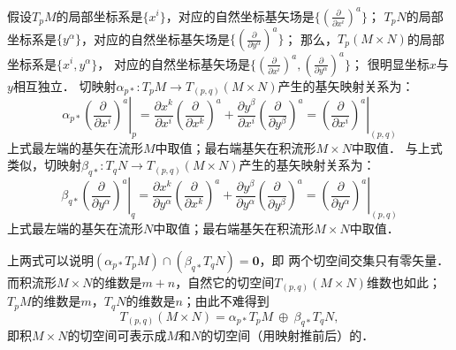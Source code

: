 假设$T_p M$的局部坐标系是$\{x^i\}$，对应的自然坐标基矢场是$\{(\frac{\partial }{\partial x^i})^a\}$；
$T_p N$的局部坐标系是$\{y^\alpha\}$，对应的自然坐标基矢场是$\{(\frac{\partial }{\partial y^\alpha})^a\}$；
那么，$T_p (M\times N)$的局部坐标系是$\{x^i,y^\alpha\}$，
对应的自然坐标基矢场是$\{(\frac{\partial }{\partial x^i})^a,(\frac{\partial }{\partial y^\alpha})^a\}$；
很明显坐标$x$与$y$相互独立．
切映射$\alpha_{p*} : T_p M \to T_{(p,q)}(M\times N)$产生的基矢映射关系为：
\begin{equation}
    \alpha_{p*} \left. \left(\frac{\partial }{\partial x^i}\right)^a \right|_{p}=
    \frac{\partial x^k}{\partial x^i}\left(\frac{\partial }{\partial x^k}\right)^a
    +\frac{\partial y^\beta}{\partial x^i}\left(\frac{\partial }{\partial y^\beta}\right)^a
    =\left. \left(\frac{\partial }{\partial x^i}\right)^a \right|_{{(p,q)}}
\end{equation}
上式最左端的基矢在流形$M$中取值；最右端基矢在积流形$M\times N$中取值．
与上式类似，切映射$\beta_{q*} : T_q N \to T_{(p,q)}(M\times N)$产生的基矢映射关系为：
\begin{equation}
    \beta_{q*} \left. \left(\frac{\partial }{\partial y^\alpha}\right)^a \right|_{q}=
    \frac{\partial x^k}{\partial y^\alpha}\left(\frac{\partial }{\partial x^k}\right)^a
    +\frac{\partial y^\beta}{\partial y^\alpha}\left(\frac{\partial }{\partial y^\beta}\right)^a
    =\left. \left(\frac{\partial }{\partial y^\alpha}\right)^a \right|_{{(p,q)}}
\end{equation}
上式最左端的基矢在流形$N$中取值；最右端基矢在积流形$M\times N$中取值．

上两式可以说明$(\alpha_{p*} T_p M) \cap (\beta_{q*}  T_q N) =\boldsymbol{0}$，即
两个切空间交集只有零矢量．而积流形$M\times N$的维数是$m+n$，自然它的切空间$T_{(p,q)} (M\times N)$维数也如此；
$T_p M$的维数是$m$，$T_q N$的维数是$n$；由此不难得到
\begin{equation}
    T_{(p,q)} (M\times N) = \alpha_{p*} T_p M \ \oplus\ \beta_{q*}  T_q N ,
\end{equation}
即积$M\times N$的切空间可表示成$M$和$N$的切空间（用映射推前后）的．


